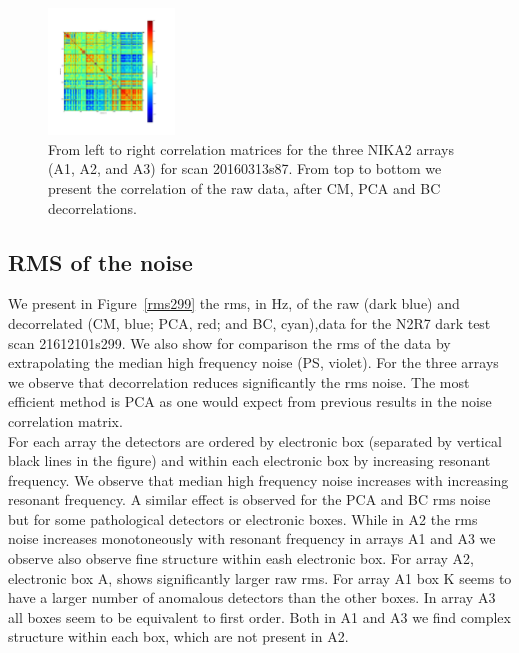\begin{figure}[ht]
\begin{center}
\includegraphics[width=0.3\textwidth]{Figures/DarkTests/corrmat_TOI_BC_array_3_20160313s87.pdf}
\end{center}
\caption{From left to right correlation matrices for the three NIKA2 arrays (A1, A2, and A3) for scan 20160313s87. From top to bottom we present the correlation of the raw data, after CM, PCA and BC decorrelations. \label{corrs87}}
\end{figure}


\subsection{RMS of the noise}

We present in Figure~\ref{rms299} the rms, in Hz, of the raw (dark blue) and decorrelated (CM, blue; PCA, red; and BC, cyan),data for the N2R7 dark test scan 21612101s299. We also show for comparison the rms of the data by extrapolating the median high frequency noise (PS, violet).
For the three arrays we observe that decorrelation reduces significantly the rms noise. The most efficient method is PCA as one would expect from previous results in the noise correlation matrix. \\

For each array the detectors are ordered by electronic box (separated by vertical black lines in the figure) and within each electronic box by increasing resonant frequency. We observe that median high frequency noise increases with increasing resonant frequency. A similar effect is observed for the PCA and BC rms noise but for some pathological detectors or electronic boxes. While in A2 the rms noise increases monotoneously with resonant frequency in arrays A1 and A3 we observe also observe fine structure within eash electronic box. For array A2, electronic box A, shows significantly larger raw rms. For array A1 box K seems to have a larger number of anomalous detectors than the other boxes. In array A3 all boxes seem to be equivalent to first order. Both in A1 and A3 we find complex structure within each box, which are not present in A2. \\

